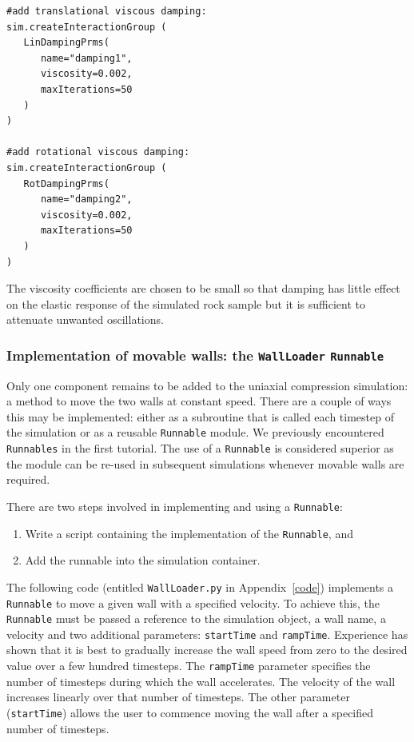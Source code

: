 \begin{verbatim}
#add translational viscous damping:
sim.createInteractionGroup (
   LinDampingPrms(
      name="damping1",
      viscosity=0.002,
      maxIterations=50
   )
)

#add rotational viscous damping:
sim.createInteractionGroup (
   RotDampingPrms(
      name="damping2",
      viscosity=0.002,
      maxIterations=50
   )
)
\end{verbatim}

\noindent
The viscosity coefficients are chosen to be small so that damping has little effect on the elastic response of the simulated rock sample but it is sufficient to attenuate unwanted oscillations. 

\subsubsection{Implementation of movable walls: the \texttt{WallLoader} \texttt{Runnable}}

Only one component remains to be added to the uniaxial compression simulation: a method to move the two walls at constant speed. There are a couple of ways this may be implemented: either  as a subroutine that is called each timestep of the simulation or as a reusable \texttt{Runnable} module. We previously encountered \texttt{Runnables} in the first tutorial. The use of a \texttt{Runnable} is considered superior as the module can be re-used in subsequent simulations whenever movable walls are required. 

There are two steps involved in implementing and using a \texttt{Runnable}:
\begin{enumerate}
\item Write a script containing the implementation of the \texttt{Runnable}, and
\item Add the runnable into the simulation container.
\end{enumerate}

\noindent
The following code (entitled \texttt{WallLoader.py} in Appendix~\ref{code}) implements a \texttt{Runnable} to move a given wall with a specified velocity. To achieve this, the \texttt{Runnable} must be passed a reference to the simulation object, a wall name, a velocity and two additional parameters: \texttt{startTime} and \texttt{rampTime}. Experience has shown that it is best to gradually increase the wall speed from zero to the desired value over a few hundred timesteps. The \texttt{rampTime} parameter specifies the number of timesteps during which the wall accelerates. The velocity of the wall increases linearly over that number of timesteps. The other parameter (\texttt{startTime}) allows the user to commence moving the wall after a specified number of timesteps. 

